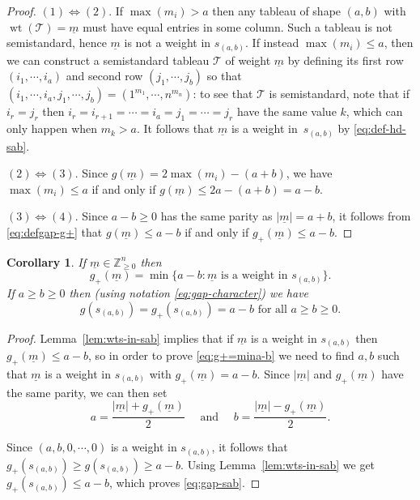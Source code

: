 \documentclass[11pt,reqno]{amsart}
\newcommand{\bb}[1]{\mathbb{#1}}
\newcommand{\mc}[1]{\mathcal{#1}}
\newcommand{\op}[1]{\operatorname{#1}}
\newcommand{\ul}[1]{\underline{#1}}
\newtheorem{corollary}[theorem]{Corollary}
\theoremstyle{definition}
\theoremstyle{remark}
\numberwithin{equation}{section}
\begin{document}
\begin{proof}
\noindent $(1) \Leftrightarrow (2)$. If $\max(m_i)>a$ then any tableau of shape $(a,b)$ with $\op{wt}(\mc{T})=\ul{m}$ must have equal entries in some column. Such a tableau is not semistandard, hence $\ul{m}$ is not a weight in $s_{(a,b)}$. If instead $\max(m_i)\leq a$, then we can construct a semistandard tableau $\mc{T}$ of weight $\ul{m}$ by defining its first row $(i_1,\cdots,i_a)$ and second row $(j_1,\cdots,j_b)$ so that $(i_1,\cdots,i_a,j_1,\cdots,j_b)=(1^{m_1},\cdots,n^{m_n})$: to see that $\mc{T}$ is semistandard, note that if $i_r=j_r$ then $i_r=i_{r+1}=\cdots=i_a=j_1=\cdots=j_r$ have the same value $k$, which can only happen when $m_k>a$. It follows that $\ul{m}$ is a weight in~$s_{(a,b)}$ by \eqref{eq:def-hd-sab}.

\noindent $(2) \Leftrightarrow (3)$. Since $g(\ul{m})=2\max(m_i)-(a+b)$, we have $\max(m_i)\leq a$ if and only if $g(\ul{m})\leq 2a-(a+b)=a-b$.

\noindent $(3) \Leftrightarrow (4)$. Since $a-b\geq 0$ has the same parity as $|\ul{m}|=a+b$, it follows from \eqref{eq:defgap-g+} that $g(\ul{m})\leq a-b$ if and only if $g_+(\ul{m})\leq a-b$.
\end{proof}

\begin{corollary}\label{cor:g+m=mina-b}
    If $\ul{m}\in\bb{Z}^n_{\geq 0}$ then
\begin{equation}\label{eq:g+=mina-b}
g_+(\ul{m}) = \min\{a-b:\ul{m}\text{ is a weight in }s_{(a,b)}\}.
\end{equation}
    If $a\geq b\geq 0$ then (using notation \eqref{eq:gap-character}) we have
\begin{equation}\label{eq:gap-sab}
g(s_{(a,b)}) = g_+(s_{(a,b)}) = a-b\text{ for all }a\geq b\geq 0.
\end{equation}
\end{corollary}

\begin{proof} Lemma~\ref{lem:wts-in-sab} implies that if $\ul{m}$ is a weight in $s_{(a,b)}$ then $g_+(\ul{m})\leq a-b$, so in order to prove \eqref{eq:g+=mina-b} we need to find $a,b$ such that $\ul{m}$ is a weight in $s_{(a,b)}$ with $g_+(\ul{m})=a-b$. Since $|\ul{m}|$ and $g_+(\ul{m})$ have the same parity, we can then set
\[
a=\frac{|\ul{m}|+g_+(\ul{m})}{2}\quad\text{ and }\quad b=\frac{|\ul{m}|-g_+(\ul{m})}{2}.
\]

    Since $(a,b,0,\cdots,0)$ is a weight in $s_{(a,b)}$, it follows that $g_+(s_{(a,b)}) \geq g(s_{(a,b)})\geq a-b$. Using Lemma~\ref{lem:wts-in-sab} we get $g_+(s_{(a,b)})\leq a-b$, which proves \eqref{eq:gap-sab}.
\end{proof}
\end{document}

